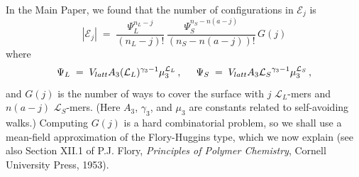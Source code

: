 \documentclass[journal=mamobx,manuscript=article]{achemso}
\newcommand{\leng}{\mathcal{L}}
\begin{document}
In the Main Paper, we found that the number of configurations in $\mathcal{E}_j$ is
\begin{equation}
    |\mathcal{E}_j|  
      \; = \; \frac{ \Psi_L^{n_L-j} }{(n_L-j)!} \,
          \frac{ \Psi_S^{n_S-n(a-j)} }{(n_S-n(a-j))!} \,  G(j)
        \label{eq.Yjsupp}
\end{equation}
where 
\begin{equation}
    \label{eq.psidefsupp}   
   \Psi_L\;=\;V_{latt} A_3 (\leng_L)^{\gamma_3-1} \mu_{3}^{\leng_L} \,,  
    \hspace{5mm} %
     \Psi_S \;=\; V_{latt}A_3{\leng_S}^{\gamma_3-1}\mu_3^{\leng_S} \,,
\end{equation}
and $G(j)$ is the number of ways to cover the surface
with $j$ $\leng_L$-mers and $n(a-j)$ $\leng_S$-mers.
(Here $A_3$, $\gamma_3$, and $\mu_3$ are constants 
related to self-avoiding walks.)  
Computing $G(j)$ is a hard combinatorial problem, so we shall use a mean-field approximation of the Flory-Huggins type, which we now explain 
(see also Section XII.1 of P.J. Flory, \textit{Principles of Polymer Chemistry}, Cornell University Press, 1953).
\end{document}

